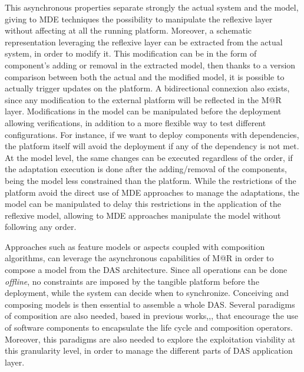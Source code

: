 This asynchronous properties separate strongly the actual system and the model, giving to MDE techniques the possibility to manipulate the reflexive layer without affecting at all the running platform.
Moreover, a schematic representation leveraging the reflexive layer can be extracted from the actual system, in order to modify it.
This modification can be in the form of component's adding or removal in the extracted model, then thanks to a version comparison between both the actual and the modified model, it is possible to actually trigger updates on the platform.
A bidirectional connexion also exists, since any modification to the external platform will be reflected in the M@R layer.
Modifications in the model can be manipulated before the deployment allowing verifications, in addition to a more flexible way to test different configurations.
For instance, if we want to deploy components with dependencies, the platform itself will avoid the deployment if any of the dependency is not met.
At the model level, the same changes can be executed regardless of the order, if the adaptation execution is done after the adding/removal of the components, being the model less constrained than the platform.
While the restrictions of the platform avoid the direct use of MDE approaches to manage the adaptations, the model can be manipulated to delay this restrictions in the application of the reflexive model, allowing to MDE approaches manipulate the model without following any order.

Approaches such as feature models or aspects\cite{morin2009taming} coupled with composition algorithms, can leverage the asynchronous capabilities of M@R in order to compose a model from the DAS architecture.
Since all operations can be done \textit{offline}, no constraints are imposed by the tangible platform before the deployment, while the system can decide when to synchronize.
Conceiving and composing models is then essential to assemble a whole DAS.
Several paradigms of composition are also needed, based in previous works\cite{morin2009mar},\cite{ko2012low},\cite{rouvoy2009music}, that encourage the use of software components to encapsulate the life cycle and composition operators.
Moreover, this paradigms are also needed to explore the exploitation viability at this granularity level, in order to manage the different parts of DAS application layer. 

